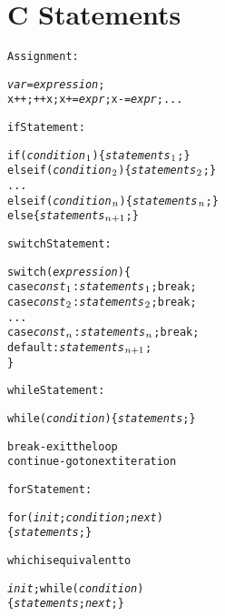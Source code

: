 \documentclass[twocolumn,12pt]{article}
\begin{document}
\section*{C Statements}
\begin{alltt}
\textrm{Assignment:}

   \emph{var} = \emph{expression};
   x++;  ++x;  x+=\emph{expr};  x-=\emph{expr}; ...

{\large if} \textrm{Statement:}

   if (\emph{condition\(\sb{1}\)}) \{ \emph{statements\(\sb{1}\)}; \}
   else if (\emph{condition\(\sb{2}\)}) \{ \emph{statements\(\sb{2}\)}; \}
   ...
   else if (\emph{condition\(\sb{n}\)}) \{ \emph{statements\(\sb{n}\)}; \}
   else \{ \emph{statements\(\sb{n+1}\)}; \}

{\large switch} \textrm{Statement:}

   switch (\emph{expression}) \{
   case \emph{const\(\sb{1}\)}: \emph{statements\(\sb{1}\)}; break;
   case \emph{const\(\sb{2}\)}: \emph{statements\(\sb{2}\)}; break;
   ...
   case \emph{const\(\sb{n}\)}: \emph{statements\(\sb{n}\)}; break;
   default: \emph{statements\(\sb{n+1}\)};
   \}

{\large while} \textrm{Statement:}

   while (\emph{condition}) \{ \emph{statements}; \}

   break - \textrm{exit the loop}
   continue - \textrm{go to next iteration}

{\large for} \textrm{Statement:}

   for (\emph{init}; \emph{condition}; \emph{next})
       \{ \emph{statements}; \}

      \textrm{\small which is equivalent to}

   \emph{init};  while (\emph{condition})
             \{ \emph{statements}; \emph{next}; \}
\end{alltt}
\end{document}
